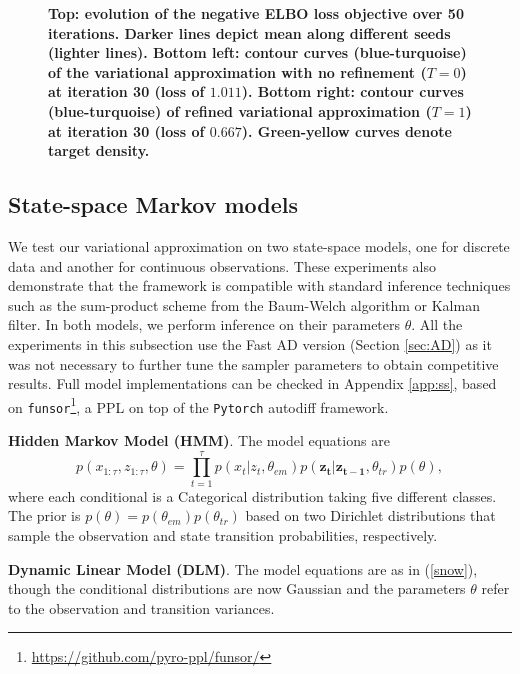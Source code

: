 \begin{figure}[!htb]
\begin{center}
\endminipage
\end{center}
\caption{{\bf Top: evolution of the negative ELBO loss objective over  50 iterations. Darker lines depict mean along different seeds (lighter lines). Bottom left: contour curves (blue-turquoise) of the variational approximation with no refinement ($T=0$) at iteration 30 (loss of $1.011$). Bottom right: contour curves (blue-turquoise) of  refined variational approximation ($T=1$) at iteration 30 (loss of $0.667$). Green-yellow curves denote target density.}}\label{fig:funnel}
\end{figure}



\subsection{State-space  Markov models}

We test our variational approximation on two state-space models, one for discrete data and another for continuous observations. These experiments also demonstrate that the framework is compatible with standard inference techniques such as the sum-product scheme from the Baum-Welch algorithm or Kalman filter.
In both models, we perform inference on their 
parameters $\theta$.
All the experiments in this subsection use the Fast AD version (Section \ref{sec:AD}) as it was not necessary to further tune the sampler parameters to obtain competitive results. Full model implementations can be checked in Appendix \ref{app:ss}, based on \texttt{funsor}\footnote{\url{https://github.com/pyro-ppl/funsor/}}, a PPL on top of the \texttt{Pytorch} autodiff framework.



\noindent\textbf{Hidden Markov Model (HMM)}. The model equations are 
\begin{equation}\label{snow}
p(x_{1:\tau} , z_{1:\tau}, \theta) = \prod_{t=1}^\tau p(x_t|z_t,\theta_{em})p(\bm{z_t|z_{t-1}},\theta_{tr})p(\theta),
\end{equation}
where each conditional is a Categorical distribution taking 
five different classes.  The prior is $p(\theta) = p(\theta_{em})p(\theta_{tr})$ based on two Dirichlet distributions that sample the observation and state transition probabilities, respectively. 

\noindent\textbf{Dynamic Linear Model (DLM)}. The model
equations are as in (\ref{snow}), though the conditional distributions are now Gaussian and the parameters $\theta$ refer to the observation and transition variances.  \\

